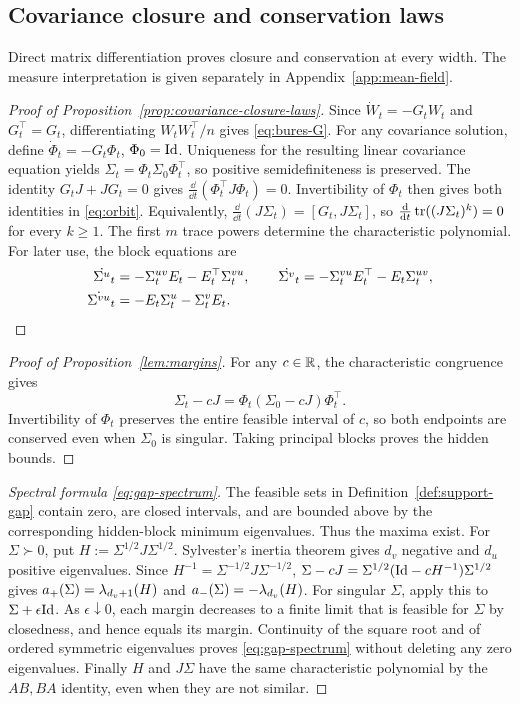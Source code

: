\subsection{Covariance closure and conservation laws}
\label{app:covariance-laws}
Direct matrix differentiation proves closure and conservation at
every width. The measure interpretation is given separately in
Appendix~\ref{app:mean-field}.

\begin{proof}[Proof of Proposition~\ref{prop:covariance-closure-laws}]
Since $\dot W_t=-G_tW_t$ and $G_t^\top=G_t$,
differentiating $W_tW_t^\top/n$ gives \eqref{eq:bures-G}.
For any covariance solution, define
$\dot\Phi_t=-G_t\Phi_t$, $\Phi_0=\mathrm{Id}$. Uniqueness for the resulting
linear covariance equation yields
$\Sigma_t=\Phi_t\Sigma_0\Phi_t^\top$, so positive semidefiniteness
is preserved. The identity $G_tJ+JG_t=0$ gives
$\frac{\dd}{\dd t}(\Phi_t^\top J\Phi_t)=0$.
Invertibility of $\Phi_t$ then gives both identities in
\eqref{eq:orbit}. Equivalently,
$\frac{\dd}{\dd t}(J\Sigma_t)=[G_t,J\Sigma_t]$, so
$\frac{\mathrm{d}}{\mathrm{d} t}\operatorname{tr}((J\Sigma_t)^k)=0$ for every $k\ge1$.
The first $m$ trace powers determine the characteristic polynomial.
For later use, the block equations are
\begin{equation}\label{eq:block-flow-general}
 \begin{aligned}
 \dot{\Sigma^u}_t&=-\Sigma^{uv}_tE_t-E_t^\top\Sigma^{vu}_t,\qquad
 \dot{\Sigma^v}_t=-\Sigma^{vu}_tE_t^\top-E_t\Sigma^{uv}_t,\\
 \dot{\Sigma^{vu}}_t&=-E_t\Sigma^u_t-\Sigma^v_tE_t.
 \end{aligned}
\end{equation}
\end{proof}

\begin{proof}[Proof of Proposition~\ref{lem:margins}]
For any $c\in\mathbb{R}$, the characteristic congruence gives
\[
 \Sigma_t-cJ=\Phi_t(\Sigma_0-cJ)\Phi_t^\top.
\]
Invertibility of $\Phi_t$ preserves the entire feasible interval of $c$,
so both endpoints are conserved even when $\Sigma_0$ is singular.
Taking principal blocks proves the hidden bounds.
\end{proof}

\begin{proof}[Spectral formula \eqref{eq:gap-spectrum}]
The feasible sets in Definition~\ref{def:support-gap} contain zero, are
closed intervals, and are bounded above by the corresponding hidden-block
minimum eigenvalues. Thus the maxima exist.
For $\Sigma\succ0$, put $H:=\Sigma^{1/2}J\Sigma^{1/2}$.
Sylvester's inertia theorem gives $d_v$ negative and $d_u$ positive
eigenvalues. Since $H^{-1}=\Sigma^{-1/2}J\Sigma^{-1/2}$,
$\Sigma-cJ=\Sigma^{1/2}(\mathrm{Id}-cH^{-1})\Sigma^{1/2}$ gives
$a_+(\Sigma)=\lambda_{d_v+1}(H)$ and
$a_-(\Sigma)=-\lambda_{d_v}(H)$.
For singular $\Sigma$, apply this to $\Sigma+\epsilon\mathrm{Id}$.
As $\epsilon\downarrow0$, each margin decreases to a finite limit that
is feasible for $\Sigma$ by closedness, and hence equals its margin.
Continuity of the square root and of ordered symmetric eigenvalues
proves \eqref{eq:gap-spectrum} without deleting any zero eigenvalues.
Finally $H$ and $J\Sigma$ have the same characteristic polynomial by
the $AB,BA$ identity, even when they are not similar.
\end{proof}

